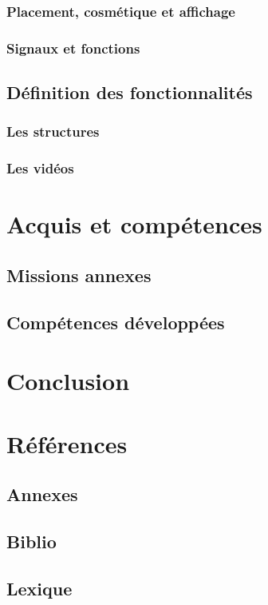 \documentclass[11pt,french,a4paper]{report}
\begin{document}
        \subsection{Placement, cosmétique et affichage}
        \subsection{Signaux et fonctions}
    \section{Définition des fonctionnalités} 
        \subsection{Les structures}
        \subsection{Les vidéos}
    

\chapter{Acquis et compétences}
    \section{Missions annexes}
    \section{Compétences développées}

\chapter{Conclusion}

\chapter{Références}
    \section{Annexes}
    \section{Biblio}
    \section{Lexique}
\end{document}
